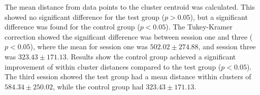 The mean distance from data points to the cluster centroid was calculated. This showed no significant difference for the test group ($p > 0.05$), but a significant difference was found for the control group ($p < 0.05$). The Tukey-Kramer correction showed the significant difference was between session one and three ($p < 0.05$), where the mean for session one was $502.02 \pm 274.88$, and session three was $323.43 \pm 171.13$. Results show the control group achieved a significant improvement of within cluster distances compared to the test group ($p < 0.05$). The third session showed the test group had a mean distance within clusters of $584.34 \pm 250.02$, while the control group had $323.43 \pm 171.13$. 
